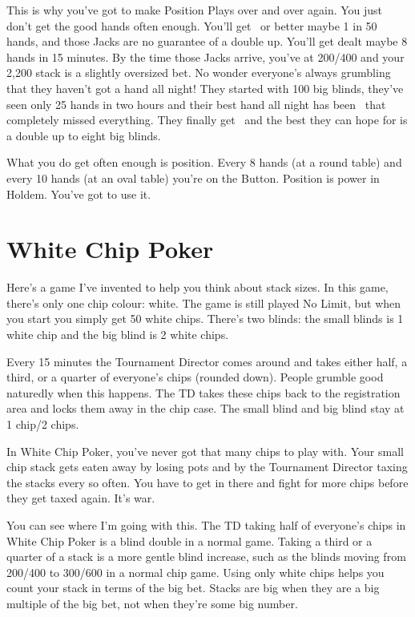 This is why you've got to make Position Plays over and over again.
You just don't get the good hands often enough. You'll get \Js\Jd\ or better
maybe 1 in 50 hands, and those Jacks are no guarantee of a double up.
You'll get dealt maybe 8 hands in 15 minutes.
By the time those Jacks arrive, you've at 200/400 and your 2,200 stack is
a slightly oversized bet. No wonder everyone's always grumbling that
they haven't got a hand all night! They started with 100 big blinds,
they've seen only 25 hands in two hours and their best hand all
night has been \Js\nines\ that completely missed everything.
They finally get \Js\Jd\ and the best they can hope for is a double
up to eight big blinds.

What you do get often enough is position. Every 8 hands (at a round table)
and every 10 hands (at an oval table) you're on the Button. Position is power in Holdem.
You've got to use it.

\section{White Chip Poker}

Here's a game I've invented to help you think about stack sizes.
In this game, there's only one chip colour: white. The game is
still played No Limit, but when you start you simply get 50 white chips.
There's two blinds: the small blinds is 1 white chip and the
big blind is 2 white chips.

Every 15 minutes the Tournament Director comes
around and takes either half, a third, or a quarter of everyone's
chips (rounded down). People grumble good naturedly when this happens.
The TD takes these chips back to the registration area and locks them away
in the chip case. The small blind and big blind stay at 1 chip/2 chips.

In White Chip Poker, you've never got that many chips to play with.
Your small chip stack gets eaten away by losing pots and by the
Tournament Director taxing the stacks every so often. You have to
get in there and fight for more chips before they get taxed again.
It's war.

You can see where I'm going with this. The TD taking half of
everyone's chips in White Chip Poker is a blind double in a normal game.
Taking a third or a quarter of a stack is a more gentle blind increase,
such as the blinds moving from 200/400 to 300/600 in a normal chip game.
Using only white chips helps you count your stack in terms of the big bet.
Stacks are big when they are a big multiple of the big bet, not when
they're some big number.

